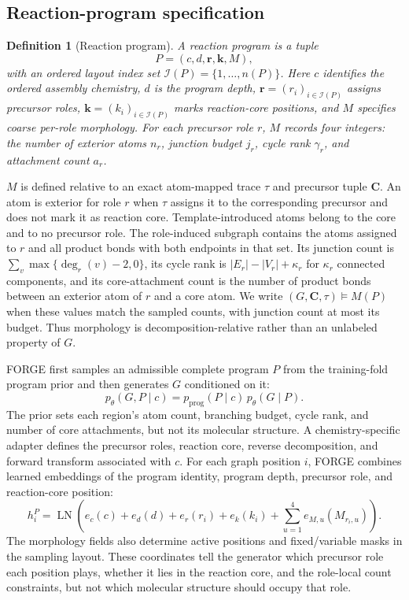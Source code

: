 \documentclass{article}
\newtheorem{definition}[theorem]{Definition}
\begin{document}
\subsection{Reaction-program specification}

\begin{definition}[Reaction program]
A reaction program is a tuple
\begin{equation}
    P=(c,d,\mathbf{r},\mathbf{k},M),
\end{equation}
with an ordered layout index set $\mathcal I(P)=\{1,\ldots,n(P)\}$. Here $c$ identifies the
ordered assembly chemistry, $d$ is the program depth,
$\mathbf r=(r_i)_{i\in\mathcal I(P)}$ assigns precursor roles,
$\mathbf k=(k_i)_{i\in\mathcal I(P)}$ marks reaction-core positions, and $M$ specifies coarse
per-role morphology.
For each precursor role $r$, $M$ records four integers: the number of exterior atoms $n_r$,
junction budget $j_r$, cycle rank $\gamma_r$, and attachment count $a_r$.
\end{definition}
$M$ is defined relative to an exact atom-mapped trace $\tau$ and precursor tuple $\mathbf C$.
An atom is exterior for role $r$ when $\tau$ assigns it to the corresponding precursor and does not
mark it as reaction core. Template-introduced atoms belong to the core and to no precursor role.
The role-induced subgraph contains the atoms assigned to $r$ and all product bonds with both
endpoints in that set. Its junction count is
$\sum_v\max\{\deg_r(v)-2,0\}$, its cycle rank is
$|E_r|-|V_r|+\kappa_r$ for $\kappa_r$ connected components, and its core-attachment count is the
number of product bonds between an exterior atom of $r$ and a core atom. We write
$(G,\mathbf C,\tau)\models M(P)$ when these values match the sampled counts, with junction count at
most its budget. Thus morphology is decomposition-relative rather than an unlabeled property of
$G$.

FORGE first samples an admissible complete program $P$ from the training-fold program prior and then
generates $G$ conditioned on it:
\begin{equation}
    p_\theta(G,P\mid c)
    = p_{\mathrm{prog}}(P\mid c)\,p_\theta(G\mid P).
\end{equation}
The prior sets each region's atom count, branching budget, cycle rank, and number of core
attachments, but not its molecular structure.
A chemistry-specific adapter defines the precursor roles, reaction core, reverse decomposition, and
forward transform associated with $c$.
For each graph position $i$, FORGE combines learned embeddings of the program identity, program
depth, precursor role, and reaction-core position:
\begin{equation}
    h_i^P
    = \operatorname{LN}\!\left(
        e_c(c) + e_d(d) + e_r(r_i) + e_k(k_i)
        + \sum_{u=1}^{4}e_{M,u}(M_{r_i,u})
    \right).
\end{equation}
The morphology fields also determine active positions and fixed/variable masks in the sampling
layout. These coordinates tell the generator which precursor role each position plays, whether it
lies in the reaction core, and the role-local count constraints, but not which molecular structure
should occupy that role.
\end{document}
